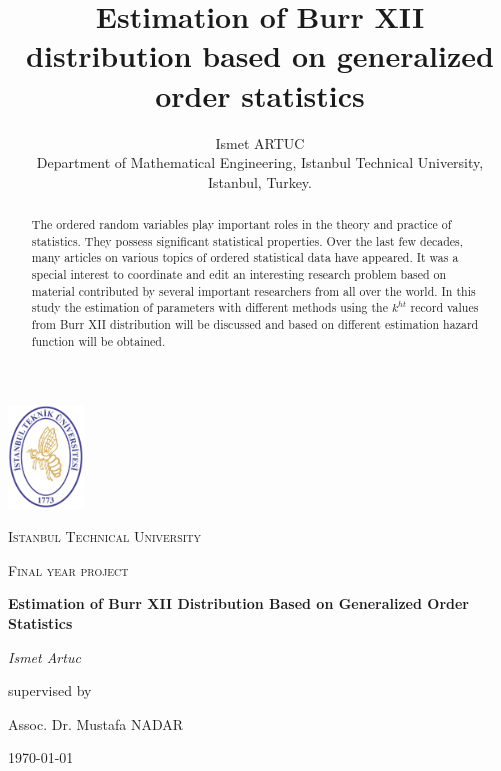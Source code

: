 \documentclass[a4paper, 11pt]{article}
\numberwithin{equation}{section}
\begin{document}
\begin{titlepage}
	\centering
	\includegraphics[width=0.15\textwidth]{itu.jpg} \par\vspace{1cm}
	{\scshape\LARGE Istanbul Technical University \par}
	\vspace{1cm}
	{\scshape\Large Final year project\par}
	\vspace{1.5cm}
	{\huge\bfseries Estimation of Burr XII Distribution Based on Generalized Order Statistics\par}
	\vspace{2cm}
	{\Large\itshape Ismet Artuc\par}
	\vfill
	supervised by\par
	Assoc. Dr. Mustafa \textsc{NADAR}
	\vfill

	{\large \today\par}
\end{titlepage}
\title{\bf Estimation of Burr XII distribution based on generalized order statistics}
\author{ Ismet ARTUC \\
\small {Department of Mathematical Engineering, Istanbul  Technical University, Istanbul, Turkey.} \\ }
\date{}
\maketitle
\tableofcontents
\newpage
\begin{abstract}
The ordered random variables play important roles in the theory and practice of statistics. They possess significant statistical properties. Over the last few decades, many articles on various topics of ordered statistical data have appeared. It was a special interest to coordinate and edit an interesting research problem based on material contributed by several important researchers from all over the world. In this study the estimation of parameters with different methods using the $ k^{ht}$ record values from Burr XII distribution will be discussed and based on different estimation hazard function will be obtained.
\end{abstract}
\end{document}
